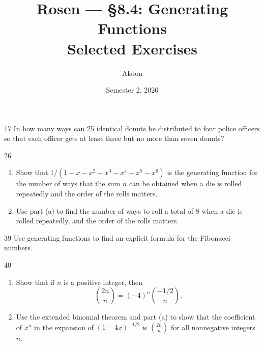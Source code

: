\documentclass[11pt]{article}
\title{Rosen --- \S 8.4: Generating Functions\\ \large Selected Exercises}
\author{Alston}
\date{Semester 2, 2026}
\begin{document}
\maketitle

\begin{exercise}{17}
    In how many ways can 25 identical donuts be distributed to four
    police officers so that each officer gets at least three but no
    more than seven donuts?
\end{exercise}

\begin{exercise}{26}
    \begin{enumerate}[label=(\alph*)]
        \item Show that $1/(1 - x - x^2 - x^3 - x^4 - x^5 - x^6)$ is
        the generating function for the number of ways that the sum
        $n$ can be obtained when a die is rolled repeatedly and the
        order of the rolls matters.
        \item Use part (a) to find the number of ways to roll a total
        of 8 when a die is rolled repeatedly, and the order of the
        rolls matters.
    \end{enumerate}
\end{exercise}

\begin{exercise}{39}
    Use generating functions to find an explicit formula for the
    Fibonacci numbers.
\end{exercise}

\begin{exercise}{40}
    \begin{enumerate}[label=(\alph*)]
        \item Show that if $n$ is a positive integer, then
        \[
        \binom{2n}{n} = (-4)^n \binom{-1/2}{n}.
        \]
        \item Use the extended binomial theorem and part (a) to show
        that the coefficient of $x^n$ in the expansion of
        $(1-4x)^{-1/2}$ is $\binom{2n}{n}$ for all nonnegative
        integers $n$.
    \end{enumerate}
\end{exercise}
\end{document}
